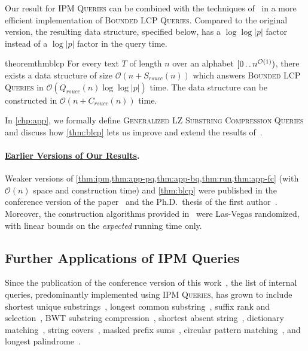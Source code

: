 \documentclass[a4paper]{article}
\theoremstyle{definition}
\theoremstyle{remark}
\newcommand{\IPM}{\textsc{IPM Queries}\xspace}
\newcommand{\BLCP}{\textsc{Bounded LCP Queries}\xspace}
\newcommand{\GSC}{\textsc{Generalized LZ Substring Compression Queries}\xspace}
\newcommand{\dd}{\mathinner{\ldotp\ldotp}}
\newcommand{\Oh}{\mathcal{O}}
\newcommand{\rsucc}{\mathit{rsucc}}
\begin{document}
Our result for \IPM can be combined with the techniques of~\cite{DBLP:journals/tcs/KellerKFL14} in a more efficient implementation of \BLCP.
Compared to the original version, the resulting data structure,
specified below, has a $\log \log |p|$ factor instead of a $\log |p|$ factor in the query time.

\begin{restatable}{theorem}{thmblcp}\label{thm:blcp}
For every text $T$ of length $n$ over an alphabet $[0 \dd n^{\Oh(1)})$, there exists a data structure of size $\Oh(n+S_{\rsucc}(n))$
which answers \BLCP in $\Oh(Q_{\rsucc}(n)\log\log |p|)$ time.
The data structure can be constructed in $\Oh(n+C_{\rsucc}(n))$ time.
\end{restatable}

In \cref{chp:app}, we formally define \GSC and discuss how \cref{thm:blcp} lets us improve and extend the results of~\cite{DBLP:journals/tcs/KellerKFL14}.

\paragraph{\underline{Earlier Versions of Our Results}.}
Weaker versions of \cref{thm:ipm,thm:app-pq,thm:app-bq,thm:run,thm:app-fc} (with $\Oh(n)$ space and construction time) and \cref{thm:blcp} were published in the conference version of the paper~\cite{DBLP:conf/soda/KociumakaRRW15} and the Ph.D.\ thesis of the first author~\cite{phd}. Moreover, the construction algorithms provided in~\cite{DBLP:conf/soda/KociumakaRRW15} were Las-Vegas randomized, with linear bounds on the \emph{expected} running time only.

\subsection{Further Applications of IPM Queries}\label{sec:alien}
Since the publication of the conference version of this work~\cite{DBLP:conf/soda/KociumakaRRW15}, 
the list of internal queries, predominantly implemented using \IPM, has grown to include
shortest unique substrings~\cite{DBLP:journals/algorithms/Abedin0PT20},
longest common substring~\cite{DBLP:journals/corr/abs-1804-08731},
suffix rank and selection~\cite{WaveletSuffixTree,DBLP:conf/cpm/Kociumaka16},
BWT substring compression~\cite{WaveletSuffixTree},
shortest absent string~\cite{DBLP:journals/tcs/BadkobehCKP22},
dictionary matching~\cite{DBLP:journals/algorithmica/Charalampopoulos21},
string covers~\cite{DBLP:conf/spire/CrochemoreIRRSW20},
masked prefix sums~\cite{DBLP:conf/spire/Das0KMW22},
circular pattern matching~\cite{CPM2023}, and
longest palindrome~\cite{DBLP:conf/walcom/MitaniMSH23}.
\end{document}
